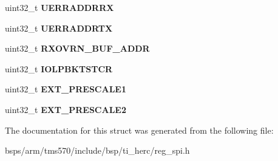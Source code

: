 \begin{DoxyCompactItemize}
\mbox{\label{structtms570__spi__t_af59aaf0d1033daac5437c2c57a1cd360}} 
uint32\+\_\+t {\bfseries U\+E\+R\+R\+A\+D\+D\+R\+RX}
\item 
\mbox{\label{structtms570__spi__t_a43be058452930ee1fa6ebe623507729b}} 
uint32\+\_\+t {\bfseries U\+E\+R\+R\+A\+D\+D\+R\+TX}
\item 
\mbox{\label{structtms570__spi__t_aaf8b08a074f317b3631e6d2613e19041}} 
uint32\+\_\+t {\bfseries R\+X\+O\+V\+R\+N\+\_\+\+B\+U\+F\+\_\+\+A\+D\+DR}
\item 
\mbox{\label{structtms570__spi__t_ad30039a1ef3f086bebac098f51c44c3f}} 
uint32\+\_\+t {\bfseries I\+O\+L\+P\+B\+K\+T\+S\+T\+CR}
\item 
\mbox{\label{structtms570__spi__t_a69c26a2b2698b3a0e822b3759022092f}} 
uint32\+\_\+t {\bfseries E\+X\+T\+\_\+\+P\+R\+E\+S\+C\+A\+L\+E1}
\item 
\mbox{\label{structtms570__spi__t_a5f4037ac9f6c95925ed292a0c9172e63}} 
uint32\+\_\+t {\bfseries E\+X\+T\+\_\+\+P\+R\+E\+S\+C\+A\+L\+E2}
\end{DoxyCompactItemize}


The documentation for this struct was generated from the following file\+:\begin{DoxyCompactItemize}
\item 
bsps/arm/tms570/include/bsp/ti\+\_\+herc/reg\+\_\+spi.\+h\end{DoxyCompactItemize}
